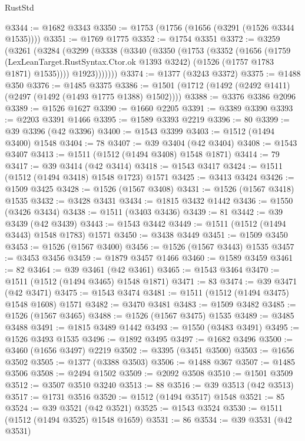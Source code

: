 \begin{lexlean}{RustStd}
\begin{coremodule}
{{@3344 := @1682 @3343
@3350 := @1753 (@1756 (@1656 (@3291 (@1526 @3344 @1535))))
@3351 := @1769 @1775
@3352 := @1754 @3351
@3372 := @3259
    (@3261
      (@3284
        (@3299
          (@3338
            (@3340
              (@3350
                (@1753
                  (@3352
                    (@1656
                      (@1759
                        (LexLeanTarget.RustSyntax.Ctor.ok @1393 @3242)
                        (@1526 (@1757 @1783 @1871) @1535))))
                  @1923)))))))
@3374 := @1377 (@3243 @3372)
@3375 := @1488 @350
@3376 := @1485 @3375
@3386 := @1501 (@1712 (@1492 (@2492 @1411) (@2497 (@1492 (@1493 @1775 @1388) @1502))))
@3388 := @3376 @3386 @2096
@3389 := @1526 @1627
@3390 := @1660 @2205
@3391 := @3389 @3390
@3393 := @2203 @3391 @1466
@3395 := @1589 @3393 @2219
@3396 := 80
@3399 := @39 @3396 (@42 @3396)
@3400 := @1543 @3399
@3403 := @1512 (@1494 @3400) @1548
@3404 := 78
@3407 := @39 @3404 (@42 @3404)
@3408 := @1543 @3407
@3413 := @1511 (@1512 (@1494 @3408) @1548 @1871)
@3414 := 79
@3417 := @39 @3414 (@42 @3414)
@3418 := @1543 @3417
@3424 := @1511 (@1512 (@1494 @3418) @1548 @1723) @1571
@3425 := @3413 @3424
@3426 := @1509 @3425
@3428 := @1526 (@1567 @3408)
@3431 := @1526 (@1567 @3418) @1535
@3432 := @3428 @3431
@3434 := @1815 @3432 @1442
@3436 := @1550 (@3426 @3434)
@3438 := @1511 (@3403 @3436)
@3439 := 81
@3442 := @39 @3439 (@42 @3439)
@3443 := @1543 @3442
@3449 := @1511 (@1512 (@1494 @3443) @1548 @1783) @1571
@3450 := @3438 @3449
@3451 := @1509 @3450
@3453 := @1526 (@1567 @3400)
@3456 := @1526 (@1567 @3443) @1535
@3457 := @3453 @3456
@3459 := @1879 @3457 @1466
@3460 := @1589 @3459
@3461 := 82
@3464 := @39 @3461 (@42 @3461)
@3465 := @1543 @3464
@3470 := @1511 (@1512 (@1494 @3465) @1548 @1871)
@3471 := 83
@3474 := @39 @3471 (@42 @3471)
@3475 := @1543 @3474
@3481 := @1511 (@1512 (@1494 @3475) @1548 @1608) @1571
@3482 := @3470 @3481
@3483 := @1509 @3482
@3485 := @1526 (@1567 @3465)
@3488 := @1526 (@1567 @3475) @1535
@3489 := @3485 @3488
@3491 := @1815 @3489 @1442
@3493 := @1550 (@3483 @3491)
@3495 := @1526 @3493 @1535
@3496 := @1892 @3495
@3497 := @1682 @3496
@3500 := @3460 (@1656 @3497) @2219
@3502 := @3395 (@3451 @3500)
@3503 := @1656 @3502
@3505 := @1377 (@3388 @3503)
@3506 := @1488 @367
@3507 := @1485 @3506
@3508 := @2494 @1502
@3509 := @2092 @3508
@3510 := @1501 @3509
@3512 := @3507 @3510 @3240
@3513 := 88
@3516 := @39 @3513 (@42 @3513)
@3517 := @1731 @3516
@3520 := @1512 (@1494 @3517) @1548
@3521 := 85
@3524 := @39 @3521 (@42 @3521)
@3525 := @1543 @3524
@3530 := @1511 (@1512 (@1494 @3525) @1548 @1659)
@3531 := 86
@3534 := @39 @3531 (@42 @3531)
}}
\end{coremodule}
\end{lexlean}
